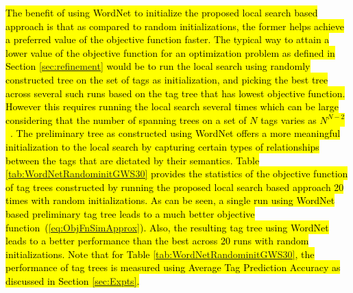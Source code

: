 \hl{The benefit of using WordNet to initialize the proposed local search based approach is that as compared to random initializations, the former helps achieve a preferred value of the objective function faster. The typical way to attain a lower value of the objective function for an optimization problem as defined in Section {\ref{sec:refinement}} would be to run the local search using randomly constructed tree on the set of tags as initialization, and picking the best tree across several such runs based on the tag tree that has lowest objective function. However this requires running the local search several times which can be large considering that the number of spanning trees on a set of $N$ tags varies as $N^{N-2}$~{\cite{cayley1894collected}}. The preliminary tree as constructed using WordNet offers a more meaningful initialization to the local search by capturing certain types of relationships between the tags that are dictated by their semantics. Table {\ref{tab:WordNetRandominitGWS30}} provides the statistics of the objective function of tag trees constructed by running the proposed local search based approach 20 times with random initializations. As can be seen, a single run using WordNet based preliminary tag tree leads to a much better objective function~({\ref{eq:ObjFnSimApprox}}). Also, the resulting tag tree using WordNet leads to a better performance than the best across 20 runs with random initializations. Note that for Table {\ref{tab:WordNetRandominitGWS30}}, the performance of tag trees is measured using Average Tag Prediction Accuracy as discussed in Section {\ref{sec:Expts}}.} 

